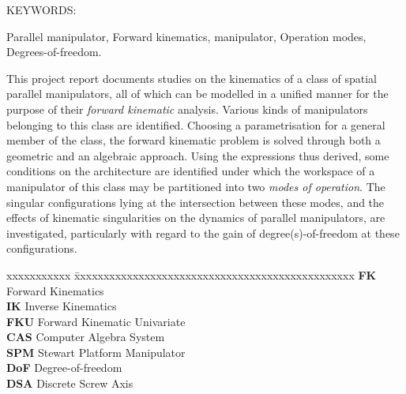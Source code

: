 \documentclass[DD]{iitmdiss}
\begin{document}

\abstract

\noindent KEYWORDS: \hspace*{0.5em} \parbox[t]{4.4in}{Parallel manipulator, Forward kinematics, \rps manipulator, Operation modes, Degrees-of-freedom.}

\vspace*{24pt}
This project report documents studies on the kinematics of a class of spatial parallel manipulators, all of which can be modelled in a unified manner for the purpose of their \emph{forward kinematic} analysis. Various kinds of manipulators belonging to this class are identified. Choosing a parametrisation for a general member of the class, the forward kinematic problem is solved through both a geometric and an algebraic approach. Using the expressions thus derived, some conditions on the architecture are identified under which the workspace of a manipulator of this class may be partitioned into two \emph{modes of operation}. The singular configurations lying at the intersection between these modes, and the effects of kinematic singularities on the dynamics of parallel manipulators, are investigated, particularly with regard to the gain of degree(s)-of-freedom at these configurations.

\pagebreak


\begin{singlespace}
\tableofcontents
\thispagestyle{empty}

\listoftables
{}
\listoffigures
{}
\end{singlespace}


\abbreviations

\noindent 
\begin{tabbing}xxxxxxxxxxx \= xxxxxxxxxxxxxxxxxxxxxxxxxxxxxxxxxxxxxxxxxxxxxxxx \kill
\textbf{FK} \> Forward Kinematics \\
\textbf{IK} \> Inverse Kinematics \\
\textbf{FKU} \> Forward Kinematic Univariate \\
\textbf{CAS} \> Computer Algebra System \\
\textbf{SPM} \> Stewart Platform Manipulator\\
\textbf{DoF} \> Degree-of-freedom\\
\textbf{DSA} \> Discrete Screw Axis\\
\end{tabbing}
\end{document}

